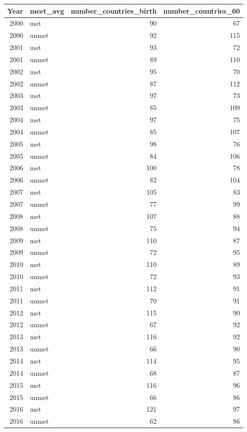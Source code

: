 \documentclass[11pt,a4paper,]{article}
\begin{document}
\begin{tabular}[t]{r|l|r|r}
\hline
Year & meet\_avg & number\_countries\_birth & number\_countries\_60\\
\hline
2000 & met & 90 & 67\\
\hline
2000 & unmet & 92 & 115\\
\hline
2001 & met & 93 & 72\\
\hline
2001 & unmet & 89 & 110\\
\hline
2002 & met & 95 & 70\\
\hline
2002 & unmet & 87 & 112\\
\hline
2003 & met & 97 & 73\\
\hline
2003 & unmet & 85 & 109\\
\hline
2004 & met & 97 & 75\\
\hline
2004 & unmet & 85 & 107\\
\hline
2005 & met & 98 & 76\\
\hline
2005 & unmet & 84 & 106\\
\hline
2006 & met & 100 & 78\\
\hline
2006 & unmet & 82 & 104\\
\hline
2007 & met & 105 & 83\\
\hline
2007 & unmet & 77 & 99\\
\hline
2008 & met & 107 & 88\\
\hline
2008 & unmet & 75 & 94\\
\hline
2009 & met & 110 & 87\\
\hline
2009 & unmet & 72 & 95\\
\hline
2010 & met & 110 & 89\\
\hline
2010 & unmet & 72 & 93\\
\hline
2011 & met & 112 & 91\\
\hline
2011 & unmet & 70 & 91\\
\hline
2012 & met & 115 & 90\\
\hline
2012 & unmet & 67 & 92\\
\hline
2013 & met & 116 & 92\\
\hline
2013 & unmet & 66 & 90\\
\hline
2014 & met & 114 & 95\\
\hline
2014 & unmet & 68 & 87\\
\hline
2015 & met & 116 & 96\\
\hline
2015 & unmet & 66 & 86\\
\hline
2016 & met & 121 & 97\\
\hline
2016 & unmet & 62 & 86\\
\hline
\end{tabular}
\end{document}
